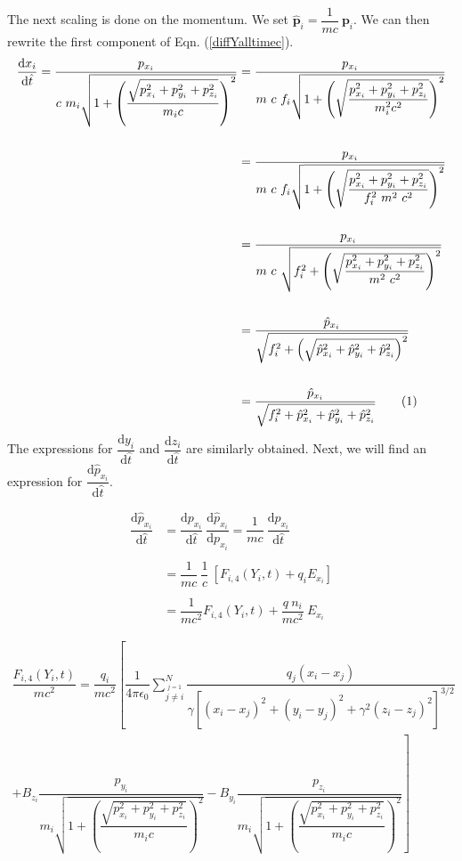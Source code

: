 \documentclass[oneside,12pt]{book}
\renewcommand{\vec}{\mathbf}
\newcommand\numberthis{\addtocounter{equation}{1}\tag{\theequation}}
\begin{document}
The next scaling is done on the momentum.  We set $\hat{\vec{p}}_i=\dfrac{1}{mc} \ \vec{p}_i $.  We can then rewrite the first component of Eqn. (\ref{diffYalltimec}).
\begin{align*}
\dfrac{\text{d}x_i}{\text{d}\hat{t}}=\dfrac{p_{x_i}}{c \ m_i \sqrt{1+\left(\dfrac{\sqrt{p_{x_i}^2 + p_{y_i}^2 + p_{z_i}^2}}{m_i c}\right)^2}}&= \dfrac{p_{x_i}}{m \ c \ f_i \sqrt{1+\left(\sqrt{\dfrac{p_{x_i}^2 + p_{y_i}^2 + p_{z_i}^2}{m_i^2 c^2}}\right)^2}}\\
\\
&=\dfrac{p_{x_i}}{m \ c \ f_i \sqrt{1+\left(\sqrt{\dfrac{p_{x_i}^2 + p_{y_i}^2 + p_{z_i}^2}{f_i^2 \ m^2 \ c^2}}\right)^2}}\\
\\
&=\dfrac{p_{x_i}}{m \ c \ \sqrt{f_i^2+\left(\sqrt{\dfrac{p_{x_i}^2 + p_{y_i}^2 + p_{z_i}^2}{m^2 \ c^2}}\right)^2}}\\
\\
&=\dfrac{\hat{p}_{x_i}}{\sqrt{f_i^2+\left(\sqrt{\hat{p}_{x_i}^2 + \hat{p}_{y_i}^2 + \hat{p}_{z_i}^2}\right)^2}}\\
\\
&=\dfrac{\hat{p}_{x_i}}{\sqrt{f_i^2+\hat{p}_{x_i}^2 + \hat{p}_{y_i}^2 + \hat{p}_{z_i}^2}}
\numberthis \label{scaledx}
\end{align*}
The expressions for $\dfrac{\text{d}y_i}{\text{d}\hat{t}}$ and $\dfrac{\text{d}z_i}{\text{d}\hat{t}}$ are similarly obtained.  Next, we will find an expression for $\dfrac{\text{d} \hat{p}_{x_i}}{\text{d} \hat{t}}$.

\begin{align*}
\dfrac{\text{d} \hat{p}_{x_i}}{\text{d} \hat{t}}&=\dfrac{\text{d} p_{x_i}}{\text{d} \hat{t}} \ \dfrac{\text{d}\hat{p}_{x_i}}{\text{d} p_{x_i}}=\dfrac{1}{mc} \ \dfrac{\text{d} p_{x_i}}{\text{d} \hat{t}}\\
\\
&=\dfrac{1}{mc} \ \dfrac{1}{c} \ \left[ F_{i,4} (Y_i,t)+q_i E_{x_i} \right]\\
\\
&=\dfrac{1}{mc^2} F_{i,4} (Y_i,t) + \dfrac{q \ n_i}{mc^2} \  E_{x_i}
\end{align*}

\begin{small}
\begin{multline*}
\dfrac{F_{i,4} (Y_i,t)}{mc^2} =\dfrac{q_i}{mc^2} \left[ \dfrac{1}{4 \pi \epsilon_0}\sum_{\stackrel{j=1}{j \neq i}}^N \dfrac{q_j(x_i-x_j)}{\gamma[(x_i-x_j)^2+(y_i-y_j)^2+\gamma^2(z_i-z_j)^2]^{3 \slash 2}} \right.\\
\left.+B_{z_i} \dfrac{p_{y_i}}{m_i \sqrt{1+\left(\dfrac{\sqrt{p_{x_i}^2 + p_{y_i}^2 + p_{z_i}^2}}{m_i c}\right)^2}} - B_{y_i} \dfrac{p_{z_i}}{m_i \sqrt{1+\left(\dfrac{\sqrt{p_{x_i}^2 + p_{y_i}^2 + p_{z_i}^2}}{m_i c}\right)^2}} \right]
\end{multline*}
\end{small}
\end{document}
